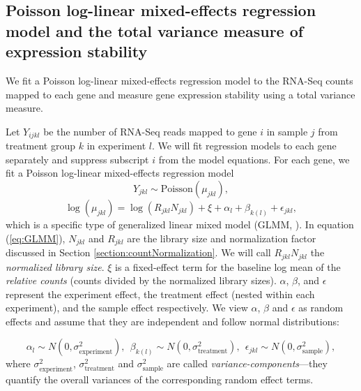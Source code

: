 \documentclass[letterpaper,12pt]{article}
\begin{document}
\subsection{Poisson log-linear mixed-effects regression model and the total
variance measure of expression stability}\label{subsection:OurMethod} 
We fit a Poisson log-linear mixed-effects regression model to the
RNA-Seq counts mapped to each gene and measure gene expression stability using
a total variance measure.

Let $Y_{ijkl}$ be the number of RNA-Seq reads mapped to gene
$i$ in sample $j$ from treatment group $k$  in experiment $l$. We will fit
regression models to each gene separately and suppress subscript $i$ from the
model equations.  For each gene, we fit a Poisson log-linear mixed-effects regression model 
\begin{equation}
  Y_{jkl} \sim \text{Poisson}(\mu_{jkl}),
\end{equation}
\begin{equation}\label{eq:GLMM}
	  \log( \mu_{jkl}) = \log(R_{jkl}N_{jkl})+ \xi + \alpha_l + \beta_{k(l)} + \epsilon_{jkl},
\end{equation}
which is a specific type of generalized linear mixed model (GLMM, \citet{mcculloch2001generalized}). 
In equation (\ref{eq:GLMM}), $N_{jkl}$ and $R_{jkl}$ are the library size and normalization factor discussed in
Section \ref{section:countNormalization}. We will call $R_{jkl}N_{jkl}$ 
the \textit{normalized library size}.
$\xi$ is a fixed-effect term for the baseline log mean of the {\em relative
counts} (counts divided by the normalized library sizes). 
$\alpha$, $\beta$, and $\epsilon$ %
represent the experiment effect, the treatment effect (nested within each
experiment), and the sample effect respectively. 
We view  $\alpha$, $\beta$ and $\epsilon$ as random effects and assume that
they are independent and follow normal distributions:

\begin{equation}\label{eq:normalassumption}
  \alpha_l\sim N(0, \sigma^2_{\text{experiment}}),~~
  \beta_{k(l)}\sim N(0, \sigma^2_{\text{treatment}}),~~
  \epsilon_{jkl}\sim N(0, \sigma_{\text{sample}}^2),
\end{equation}
where $\sigma_{\text{experiment}}^2$, $\sigma_{\text{treatment}}^2$ and
$\sigma_{\text{sample}}^2$ are called \textit{variance-components}---they
quantify the overall variances of the corresponding random effect terms. 
\end{document}
